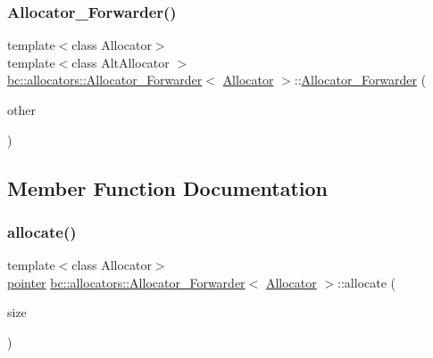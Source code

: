 \subsubsection{\texorpdfstring{Allocator\+\_\+\+Forwarder()}{Allocator\_Forwarder()}\hspace{0.1cm}{\footnotesize\ttfamily [2/2]}}
{\footnotesize\ttfamily template$<$class Allocator$>$ \\
template$<$class Alt\+Allocator $>$ \\
\hyperlink{structbc_1_1allocators_1_1Allocator__Forwarder}{bc\+::allocators\+::\+Allocator\+\_\+\+Forwarder}$<$ \hyperlink{classbc_1_1allocators_1_1Allocator}{Allocator} $>$\+::\hyperlink{structbc_1_1allocators_1_1Allocator__Forwarder}{Allocator\+\_\+\+Forwarder} (\begin{DoxyParamCaption}\item[{const \hyperlink{structbc_1_1allocators_1_1Allocator__Forwarder}{Allocator\+\_\+\+Forwarder}$<$ Alt\+Allocator $>$ \&}]{other }\end{DoxyParamCaption})\hspace{0.3cm}{\ttfamily [inline]}}



\subsection{Member Function Documentation}
\mbox{\label{structbc_1_1allocators_1_1Allocator__Forwarder_ae4cfe7f365197fa85632a9bb2c585af8}} 
\subsubsection{\texorpdfstring{allocate()}{allocate()}}
{\footnotesize\ttfamily template$<$class Allocator$>$ \\
\hyperlink{structbc_1_1allocators_1_1Allocator__Forwarder_ae9d48fbeb22a6686ad59128cf309d8bd}{pointer} \hyperlink{structbc_1_1allocators_1_1Allocator__Forwarder}{bc\+::allocators\+::\+Allocator\+\_\+\+Forwarder}$<$ \hyperlink{classbc_1_1allocators_1_1Allocator}{Allocator} $>$\+::allocate (\begin{DoxyParamCaption}\item[{\hyperlink{structbc_1_1allocators_1_1Allocator__Forwarder_a254a9a5b0ac8837f64c107db7067e985}{size\+\_\+type}}]{size }\end{DoxyParamCaption})\hspace{0.3cm}{\ttfamily [inline]}}

